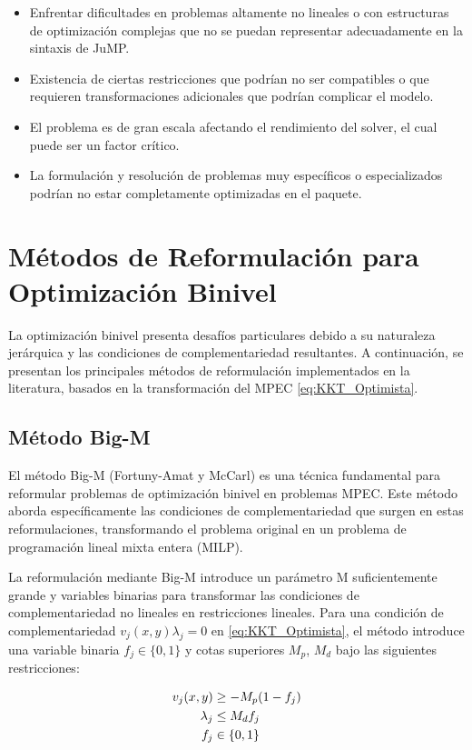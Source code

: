 \begin{itemize}
    \item Enfrentar dificultades en problemas altamente no lineales o con estructuras de optimización complejas que no se puedan representar adecuadamente en la sintaxis de JuMP.
    \item Existencia de ciertas restricciones que podrían no ser compatibles o que requieren transformaciones adicionales que podrían complicar el modelo.
    \item El problema es de gran escala afectando el rendimiento del solver, el cual puede ser un factor crítico.
    \item La formulación y resolución de problemas muy específicos o especializados podrían no estar completamente optimizadas en el paquete.
\end{itemize}


\section{Métodos de Reformulación para Optimización Binivel}
La optimización binivel presenta desafíos particulares debido a su naturaleza jerárquica y las condiciones de complementariedad resultantes. A continuación, se presentan los principales métodos de reformulación implementados en la literatura, basados en la transformación del MPEC \eqref{eq:KKT_Optimista}.
\subsection{Método Big-M}

El método Big-M (Fortuny-Amat y McCarl)  es una técnica fundamental para reformular problemas de optimización binivel en problemas MPEC. 
Este método aborda específicamente las condiciones de complementariedad que surgen en estas reformulaciones, transformando el problema original en un problema de programación lineal mixta entera (MILP).

La reformulación mediante Big-M introduce un parámetro M suficientemente grande y variables binarias para transformar las condiciones de complementariedad no lineales en restricciones lineales. Para una condición de complementariedad 
$v_j(x,y)\lambda_j = 0$ en \eqref{eq:KKT_Optimista}, el método introduce una variable binaria  $f_j \in \{0,1\}$ y cotas superiores $M_p$, $M_d$ bajo  las siguientes restricciones:

\begin{align}
    v_j(x,y) &\geq -M_p(1 - f_j) \notag \\
    \lambda_j &\leq M_d f_j \\
    f_j &\in \{0,1\} \notag
\end{align}

